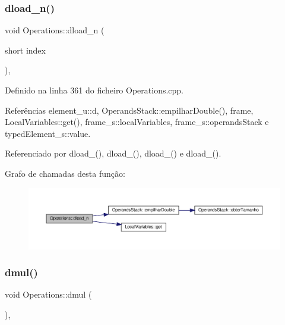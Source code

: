 \subsubsection{\texorpdfstring{dload\+\_\+n()}{dload\_n()}}
{\footnotesize\ttfamily void Operations\+::dload\+\_\+n (\begin{DoxyParamCaption}\item[{short}]{index }\end{DoxyParamCaption})\hspace{0.3cm}{\ttfamily [static]}, {\ttfamily [private]}}



Definido na linha 361 do ficheiro Operations.\+cpp.



Referências element\+\_\+u\+::d, Operands\+Stack\+::empilhar\+Double(), frame, Local\+Variables\+::get(), frame\+\_\+s\+::local\+Variables, frame\+\_\+s\+::operands\+Stack e typed\+Element\+\_\+s\+::value.



Referenciado por dload\+\_(), dload\+\_(), dload\+\_() e dload\+\_().

Grafo de chamadas desta função\+:\nopagebreak
\begin{figure}[H]
\begin{center}
\leavevmode
\includegraphics[width=350pt]{classOperations_a44536bc4112eb4eebe23ff85e9b7d02b_cgraph}
\end{center}
\end{figure}
\mbox{\label{classOperations_afe1944066f35f66d588d1a28124ebb55}} 
\subsubsection{\texorpdfstring{dmul()}{dmul()}}
{\footnotesize\ttfamily void Operations\+::dmul (\begin{DoxyParamCaption}{ }\end{DoxyParamCaption})\hspace{0.3cm}{\ttfamily [static]}, {\ttfamily [private]}}



